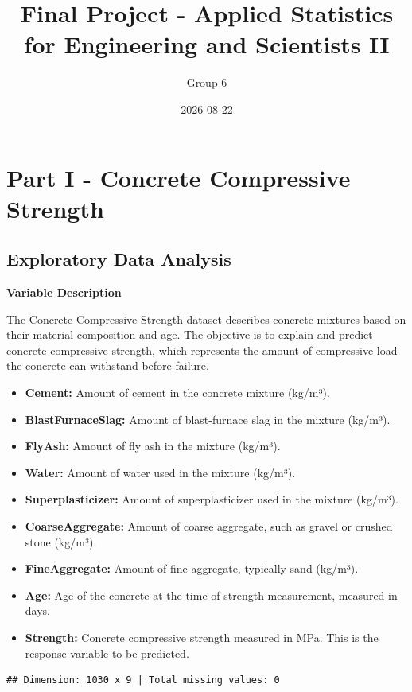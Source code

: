 \documentclass[
  11pt,
]{article}
\title{Final Project - Applied Statistics for Engineering and Scientists
II}
\subtitle{Group 6}
\author{}
\date{\vspace{-2.5em}2026-08-22}
\begin{document}
\maketitle

{
\setcounter{tocdepth}{3}
\tableofcontents
}
\newpage

\section{Part I - Concrete Compressive
Strength}\label{part-i---concrete-compressive-strength}

\subsection{Exploratory Data Analysis}\label{exploratory-data-analysis}

\textbf{Variable Description}

The Concrete Compressive Strength dataset describes concrete mixtures
based on their material composition and age. The objective is to explain
and predict concrete compressive strength, which represents the amount
of compressive load the concrete can withstand before failure.

\begin{itemize}
\item
  \textbf{Cement:} Amount of cement in the concrete mixture (kg/m³).
\item
  \textbf{BlastFurnaceSlag:} Amount of blast-furnace slag in the mixture
  (kg/m³).
\item
  \textbf{FlyAsh:} Amount of fly ash in the mixture (kg/m³).
\item
  \textbf{Water:} Amount of water used in the mixture (kg/m³).
\item
  \textbf{Superplasticizer:} Amount of superplasticizer used in the
  mixture (kg/m³).
\item
  \textbf{CoarseAggregate:} Amount of coarse aggregate, such as gravel
  or crushed stone (kg/m³).
\item
  \textbf{FineAggregate:} Amount of fine aggregate, typically sand
  (kg/m³).
\item
  \textbf{Age:} Age of the concrete at the time of strength measurement,
  measured in days.
\item
  \textbf{Strength:} Concrete compressive strength measured in MPa. This
  is the response variable to be predicted.
\end{itemize}

\begin{verbatim}
## Dimension: 1030 x 9 | Total missing values: 0
\end{verbatim}
\end{document}
